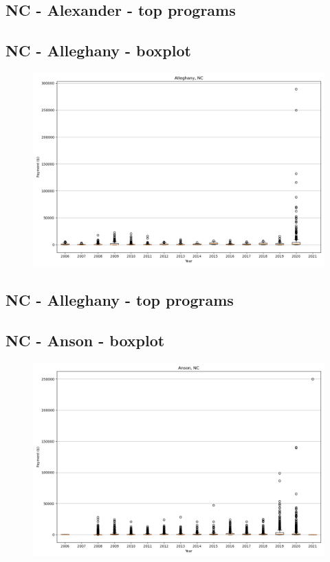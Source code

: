\subsection*{NC - Alexander - top programs}

\newpage
\subsection*{NC - Alleghany - boxplot}
\begin{figure}[h]
\centering
\includegraphics[width=7in]{../output/boxplots/counties/Alleghany-NC_boxplot.png}
\end{figure}


\subsection*{NC - Alleghany - top programs}

\newpage
\subsection*{NC - Anson - boxplot}
\begin{figure}[h]
\centering
\includegraphics[width=7in]{../output/boxplots/counties/Anson-NC_boxplot.png}
\end{figure}


